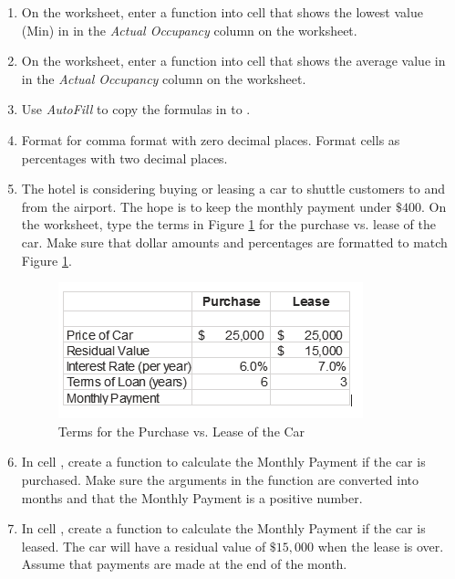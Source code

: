 \begin{enumbox}
\begin{enumerate}
		\item On the  worksheet, enter a function into cell  that shows the lowest value (Min) in  in the \textit{Actual Occupancy} column on the  worksheet.
		
		\item On the  worksheet, enter a function into cell  that shows the average value in  in the \textit{Actual Occupancy} column on the  worksheet.
		
		\item Use \textit{AutoFill} to copy the formulas in  to .
		
		\item Format  for comma format with zero decimal places. Format cells  as percentages with two decimal places.
		
		\item The hotel is considering buying or leasing a car to shuttle customers to and from the airport. The hope is to keep the monthly payment under $ \$400 $. On the  worksheet, type the terms in Figure \ref{02:fig50} for the purchase vs. lease of the car. Make sure that dollar amounts and percentages are formatted to match Figure \ref{02:fig50}.

		\begin{figure}[H]
			\centering
			\includegraphics[width=\maxwidth{.95\linewidth}]{gfx/ch02_fig50}
			\caption{Terms for the Purchase vs. Lease of the Car}
			\label{02:fig50}
		\end{figure}

		\item In cell , create a  function to calculate the Monthly Payment if the car is purchased. Make sure the arguments in the  function are converted into months and that the Monthly Payment is a positive number.
		
		\item In cell , create a  function to calculate the Monthly Payment if the car is leased. The car will have a residual value of $ \$15,000 $ when the lease is over. Assume that payments are made at the end of the month.
		

\end{enumerate}
\end{enumbox}
